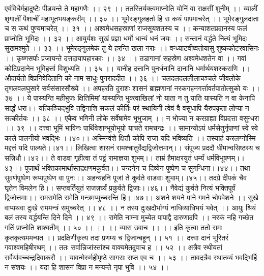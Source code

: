 एवंविधैर्महादुष्टैः पीड्यन्ते ते महागणैः ।। २९ ।।
ततस्तिर्यक्त्वमाप्नोति योनिं वा राक्षसीं शुनीम् ।।
व्यालीं शृगालीं पैशाचीं महाभूतभयङ्करीम् ।। ३० ।।
भूमेरङ्गुलहर्ता हि स कथं पापमाचरेत् ।।
भूमेरङ्गुलदाता च स कथं पुण्यमाचरेत् ।। ३१ ।।
अश्वमेधसहस्राणां राजसूयशतस्य च ।।
कन्याशतप्रदानस्य फलं प्राप्नोति भूमिदः ।। ३२ ।।
आयुर्यशः सुखं प्रज्ञा धर्मो धान्यं धनं जयः ।।
सन्तानं वर्द्धते नित्यं भूमिदः सुखमश्मुते ।। ३३ ।।
भूमेरङ्गुलमेकं तु ये हरन्ति खला नराः ।।
वन्ध्याटवीष्वतोयासु शुष्ककोटरवासिनः ।।
कृष्णसर्पाः प्रजायन्ते दत्तदायापहारकाः ।। ३४ ।।
तडागानां सहस्रेण अश्वमेधशतेन वा ।।
गवां कोटिप्रदानेन भूमिहर्त्ता विशुध्यति ।। ३५ ।।
यानीह दत्तानि पुनर्धनानि दानानि धर्मार्थयशस्कराणि ।।
औदार्यतो विप्रनिवेदितानि को नाम साधुः पुनराददीत ।। ३६ ।।
चलदलदललीलाचञ्चले जीवलोके तृणलवलघुसारे सर्वसंसारसौख्ये ।।
अपहरति दुराशः शासनं ब्राह्मणानां नरकगहनगर्त्तावर्तपातोत्सुको यः ।।३७ ।।
ये पास्यन्ति महीभुजः क्षितिमिमां यास्यन्ति भुक्त्वाखिलां नो याता न तु याति यास्यति न वा केनापि सार्द्धं धरा।।
यत्किञ्चिद्भुवि तद्विनाशि सकलं कीर्तिः परं स्थायिनी त्वेवं वै वसुधापि यैरुपकृता लोप्या न सत्कीर्तयः ।। ३८ ।।
एकैव भगिनी लोके सर्वेषामेव भूभुजाम् ।।
न भोज्या न करग्राह्या विप्रदत्ता वसुन्धरा ।। ३९ ।।
दत्त्वा भूमिं भाविनः पार्थिवेशान्भूयोभूयो याचते रामचन्द्रः ।।
सामान्योऽयं धर्मसेतुर्नृपाणां स्वे स्वे काले पालनीयो भवद्भिः ।।४०।।
अस्मिन्वंशे क्षितौ कोपि राजा यदि भविष्यति ।।
तस्याहं करलग्नोस्मि मद्दत्तं यदि पाल्यते।।४१।।
लिखित्वा शासनं रामश्चातुर्वेद्यद्विजोत्तमान्।।
संपूज्य प्रददौ धीमान्वसिष्ठस्य च सन्निधौ।।४२।।
ते वाडवा गृहीत्वा तं पट्टं रामाज्ञया शुभम्।।
ताम्रं हैमाक्षरयुतं धर्म्यं धर्मविभूषणम्।।४३।।
पूजार्थं भक्तिकामार्थास्तद्रक्षणमकुर्वत।।
चन्दनेन च दिव्येन पुष्पेण च सुगन्धिना।।४४।।
तथा सुवर्णपुष्पेण रूप्यपुष्पेण वा पुनः।।
अहन्यहनि पूजां ते कुर्वते वाडवाः शुभाम्।।४५।।
तदग्रे दीपकं चैव घृतेन विमलेन हि।।
सप्तवर्तियुतं राजन्नर्घ्यं प्रकुर्वते द्विजाः।।४६।।
नैवेद्यं कुर्वते नित्यं भक्तिपूर्वं द्विजोत्तमाः।।
रामरामेति रामेति मन्त्रमप्युच्चरन्ति हि।।४७।।
अशने शयने पाने गमने चोपवेशने ।।
सुखे वाप्यथवा दुःखे राममन्त्रं समुच्चरेत् ।। ४८ ।।
न तस्य दुःखदौर्भाग्यं नाधिव्याधिभयं भवेत् ।।
आयुः श्रियं बलं तस्य वर्द्धयन्ति दिने दिने ।। ४९ ।।
रामेति नाम्ना मुच्येत पापाद्वै दारुणादपि ।।
नरकं नहि गच्छेत गतिं प्राप्नोति शाश्वतीम् ।। ५० ।। ।।
।। व्यास उवाच ।। ।।
इति कृत्वा ततो रामः कृतकृत्यममन्यत ।।
प्रदक्षिणीकृत्य तदा प्रणम्य च द्विजान्बहून् ।। ५१ ।।
दत्त्वा दानं भूरितरं गवाश्वमहिषीरथम् ।।
ततः सर्वान्निजांस्तांश्च वाक्यमेतदुवाच ह ।। ५२ ।।
अत्रैव स्थीयतां सर्वैर्यावच्चन्द्रदिवाकरौ ।।
यावन्मेरुर्महीपृष्ठे सागराः सप्त एव च ।। ५३ ।।
तावदत्रैव स्थातव्यं भवद्भिर्हि न संशयः ।।
यदा हि शासनं विप्रा न मन्यन्ते नृपा भुवि ।। ५४ ।।
